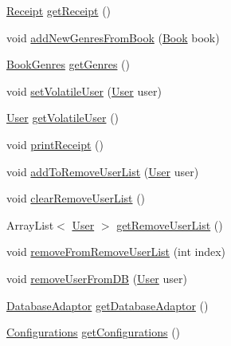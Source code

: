 \begin{DoxyCompactItemize}
\item 
\hyperlink{classw3se_1_1_model_1_1_base_1_1_receipt}{Receipt} \hyperlink{classw3se_1_1_model_1_1_i_m_s_a3a1030d3784e7474ecc740e4b0c423f6}{get\-Receipt} ()
\item 
void \hyperlink{classw3se_1_1_model_1_1_i_m_s_a8ca8aac1cdf9ff3b09d0199426973517}{add\-New\-Genres\-From\-Book} (\hyperlink{classw3se_1_1_model_1_1_base_1_1_book}{Book} book)
\item 
\hyperlink{classw3se_1_1_model_1_1_base_1_1_book_genres}{Book\-Genres} \hyperlink{classw3se_1_1_model_1_1_i_m_s_ad7e375befeff2349d10768edc810fd5e}{get\-Genres} ()
\item 
void \hyperlink{classw3se_1_1_model_1_1_i_m_s_a388b3d6ff28853005a0e6e0b53031545}{set\-Volatile\-User} (\hyperlink{classw3se_1_1_model_1_1_base_1_1_user}{User} user)
\item 
\hyperlink{classw3se_1_1_model_1_1_base_1_1_user}{User} \hyperlink{classw3se_1_1_model_1_1_i_m_s_a958f0462ed9832f4f7f3a64415761777}{get\-Volatile\-User} ()
\item 
void \hyperlink{classw3se_1_1_model_1_1_i_m_s_aeb30e6437bf19e4dac32897ced815674}{print\-Receipt} ()
\item 
void \hyperlink{classw3se_1_1_model_1_1_i_m_s_a808c25901da72734cc5721faaeabeb34}{add\-To\-Remove\-User\-List} (\hyperlink{classw3se_1_1_model_1_1_base_1_1_user}{User} user)
\item 
void \hyperlink{classw3se_1_1_model_1_1_i_m_s_a70cf4a37948461d3d86fd0558c6f8455}{clear\-Remove\-User\-List} ()
\item 
Array\-List$<$ \hyperlink{classw3se_1_1_model_1_1_base_1_1_user}{User} $>$ \hyperlink{classw3se_1_1_model_1_1_i_m_s_ae9aac3f1f6ef820a5c33389b6bf1f2af}{get\-Remove\-User\-List} ()
\item 
void \hyperlink{classw3se_1_1_model_1_1_i_m_s_a371f27cd65f61899d30bad677401ea7c}{remove\-From\-Remove\-User\-List} (int index)
\item 
void \hyperlink{classw3se_1_1_model_1_1_i_m_s_a2cc2b6a5384430f7f91277e47c90cdad}{remove\-User\-From\-D\-B} (\hyperlink{classw3se_1_1_model_1_1_base_1_1_user}{User} user)
\item 
\hyperlink{classw3se_1_1_model_1_1_database_1_1_database_adaptor}{Database\-Adaptor} \hyperlink{classw3se_1_1_model_1_1_i_m_s_afa0ad7e57584187196a17eb95b7672d1}{get\-Database\-Adaptor} ()
\item 
\hyperlink{classw3se_1_1_model_1_1_configurations}{Configurations} \hyperlink{classw3se_1_1_model_1_1_i_m_s_a670756e839e0ab6a8c19c2cfef825bbb}{get\-Configurations} ()

\end{DoxyCompactItemize}
